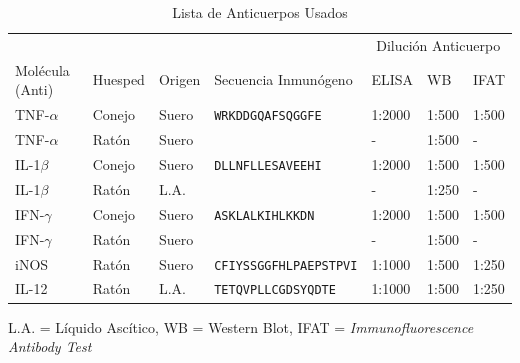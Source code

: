 \documentclass[12pt,letterpaper,oneside]{scrbook}
\begin{document}
\begin{table}[h!]
    \sffamily
    \begin{center}
        \begin{threeparttable}
        \caption{Lista de Anticuerpos Usados}\label{tabla:anticuerpos}
            \begin{tabularx}{16cm}{l l l X l l l}
                \toprule
                \multicolumn{4}{c}{} & \multicolumn{3}{c}{Dilución Anticuerpo} \\
                \cmidrule(r){5-7}
                Molécula (Anti) & Huesped & Origen & Secuencia Inmunógeno & ELISA & WB & IFAT \\
                \midrule
                TNF-$\alpha$ & Conejo & Suero & \texttt{WRKDDGQAFSQGGFE} & 1:2000 & 1:500 & 1:500 \\
                TNF-$\alpha$ & Ratón & Suero & \texttt{ } & - & 1:500 & - \\
                IL-1$\beta$ & Conejo & Suero &  \texttt{DLLNFLLESAVEEHI} & 1:2000 & 1:500 & 1:500 \\
                IL-1$\beta$ & Ratón & L.A. & \texttt{} & - & 1:250 & - \\
                IFN-$\gamma$ & Conejo & Suero & \texttt{ASKLALKIHLKKDN} & 1:2000 & 1:500 & 1:500 \\
                IFN-$\gamma$ & Ratón & Suero & \texttt{ } & - & 1:500 & - \\
                iNOS & Ratón & Suero & \texttt{CFIYSSGGFHLPAEPSTPVI} & 1:1000 & 1:500 & 1:250 \\
                IL-12 & Ratón & L.A. & \texttt{TETQVPLLCGDSYQDTE} & 1:1000 & 1:500 & 1:250 \\
                \bottomrule
            \end{tabularx}
            \begin{tablenotes}
                \item *L.A. = Líquido Ascítico, WB = Western Blot, IFAT = \emph{Immunofluorescence Antibody Test}
            \end{tablenotes}
        \end{threeparttable}
    \end{center}
\end{table}
\end{document}
